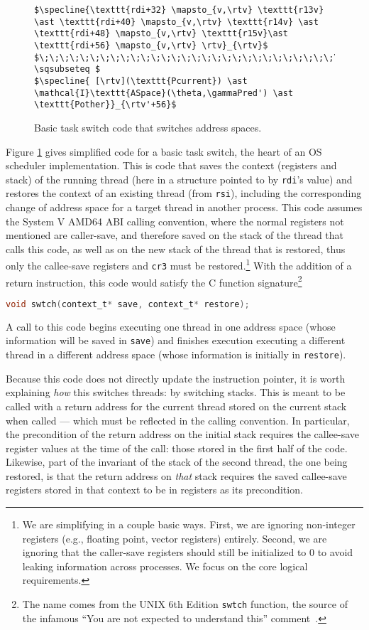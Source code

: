 \begin{figure}
\begin{lstlisting}
$\specline{\texttt{rdi+32} \mapsto_{v,\rtv} \texttt{r13v} \ast \texttt{rdi+40} \mapsto_{v,\rtv} \texttt{r14v} \ast \texttt{rdi+48} \mapsto_{v,\rtv} \texttt{r15v}\ast \texttt{rdi+56} \mapsto_{v,\rtv} \rtv}_{\rtv}$
$\;\;\;\;\;\;\;\;\;\;\;\;\;\;\;\;\;\;\;\;\;\;\;\;\;\;\;\;\;\;\;\;\;\;\;\;\;\;\;\;\;\;\;\; \sqsubseteq $
$\specline{ [\rtv](\texttt{Pcurrent}) \ast \mathcal{I}\texttt{ASpace}(\theta,\gammaPred') \ast \texttt{Pother}}_{\rtv'+56}$
\end{lstlisting}
\caption{Basic task switch code that switches address spaces.}
\label{fig:swtch}
\end{figure}

Figure \ref{fig:swtch} gives simplified code for a basic task switch, the heart of an OS scheduler implementation. This is code that saves the context (registers and stack) of the running thread (here in a structure pointed to by \lstinline|rdi|'s value) and restores the context of an existing thread (from \lstinline|rsi|), including the corresponding change of address space for a target thread in another process.
This code assumes the System V AMD64 ABI calling convention, where the normal registers not mentioned are caller-save, and therefore saved on the stack of the thread that calls this code, as well as on the new stack of the thread that is restored, thus only the callee-save registers and \texttt{cr3} must be restored.\footnote{We are simplifying in a couple basic ways. First, we are ignoring non-integer registers (e.g., floating point, vector registers) entirely. Second, we are ignoring that the caller-save registers should still be initialized to 0 to avoid leaking information across processes. We focus on the core logical requirements.}
With the addition of a return instruction, this code would satisfy the C function signature\footnote{The name comes from the UNIX 6th Edition \lstinline|swtch| function, the source of the infamous ``You are not expected to understand this'' comment~\cite{lions1996lions}.}
\begin{lstlisting}[language=C]
void swtch(context_t* save, context_t* restore);
\end{lstlisting}
A call to this code begins executing one thread in one address space (whose information will be saved in \lstinline[language=C]|save|) and finishes execution executing a different thread in a different address space (whose information is initially in \lstinline[language=C]|restore|).

Because this code does not directly update the instruction pointer, it is worth explaining \emph{how} this switches threads: by switching stacks. This is meant to be called with a return address for the current thread stored on the current stack when called --- which must be reflected in the calling convention. In particular, the precondition of the return address on the initial stack requires the callee-save register values at the time of the call: those stored in the first half of the code.
Likewise, part of the invariant of the stack of the second thread, the one being restored, is that the return address on \emph{that} stack requires the saved callee-save registers stored in that context to be in registers as its precondition.

